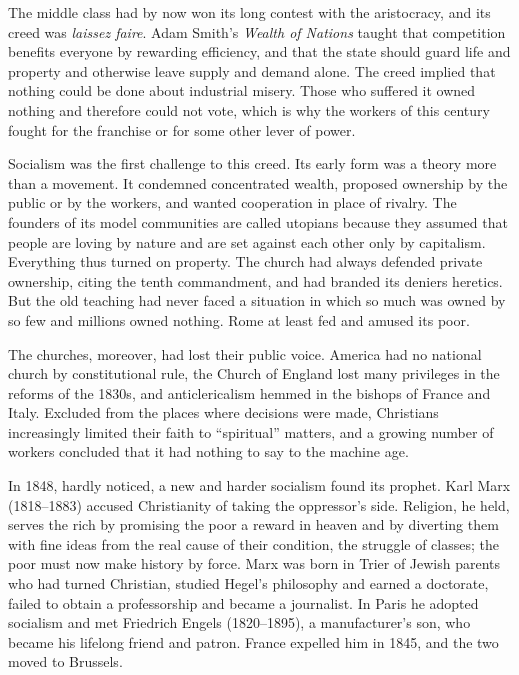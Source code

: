The middle class had by now won its long contest with the aristocracy, and its creed was
\emph{laissez faire}. Adam Smith's \emph{Wealth of Nations} taught that competition benefits everyone
by rewarding efficiency, and that the state should guard life and property and otherwise leave supply
and demand alone. The creed implied that nothing could be done about industrial misery. Those who
suffered it owned nothing and therefore could not vote, which is why the workers of this century
fought for the franchise or for some other lever of power.

Socialism was the first challenge to this creed. Its early form was a theory more than a movement. It
condemned concentrated wealth, proposed ownership by the public or by the workers, and wanted
cooperation in place of rivalry. The founders of its model communities are called utopians because
they assumed that people are loving by nature and are set against each other only by capitalism.
Everything thus turned on property. The church had always defended private ownership, citing the
tenth commandment, and had branded its deniers heretics. But the old teaching had never faced a
situation in which so much was owned by so few and millions owned nothing. Rome at least fed and
amused its poor.

The churches, moreover, had lost their public voice. America had no national church by
constitutional rule, the Church of England lost many privileges in the reforms of the 1830s, and
anticlericalism hemmed in the bishops of France and Italy. Excluded from the places where decisions
were made, Christians increasingly limited their faith to ``spiritual'' matters, and a growing number
of workers concluded that it had nothing to say to the machine age.

In 1848, hardly noticed, a new and harder socialism found its prophet. Karl Marx (1818--1883) accused
Christianity of taking the oppressor's side. Religion, he held, serves the rich by promising the poor
a reward in heaven and by diverting them with fine ideas from the real cause of their condition, the
struggle of classes; the poor must now make history by force. Marx was born in Trier of Jewish
parents who had turned Christian, studied Hegel's philosophy and earned a doctorate, failed to obtain
a professorship and became a journalist. In Paris he adopted socialism and met Friedrich Engels
(1820--1895), a manufacturer's son, who became his lifelong friend and patron. France expelled him in
1845, and the two moved to Brussels.

